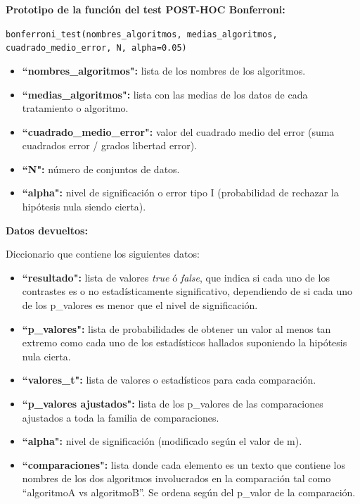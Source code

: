 \noindent
\textbf{Prototipo de la función del test POST-HOC Bonferroni:}

\texttt{bonferroni\_test(nombres\_algoritmos, medias\_algoritmos, cuadrado\_medio\_error, N, alpha=0.05)}

\begin{itemize}
\item \textbf{``nombres\_algoritmos":} lista de los nombres de los algoritmos.
\item \textbf{``medias\_algoritmos":} lista con las medias de los datos de cada tratamiento o algoritmo.
\item \textbf{``cuadrado\_medio\_error":} valor del cuadrado medio del error (suma cuadrados error / grados libertad error).
\item \textbf{``N":} número de conjuntos de datos.
\item \textbf{``alpha":} nivel de significación o error tipo I (probabilidad de rechazar la hipótesis nula siendo cierta).
\end{itemize}

\noindent
\textbf{Datos devueltos:}

Diccionario que contiene los siguientes datos:

\begin{itemize}
\item \textbf{``resultado":} lista de valores \textit{true} ó \textit{false}, que indica si cada uno de los contrastes es o no estadísticamente significativo, dependiendo de si cada uno de los p\_valores es menor que el nivel de significación.
\item \textbf{``p\_valores":} lista de probabilidades de obtener un valor al menos tan extremo como cada uno de los estadísticos hallados suponiendo la hipótesis nula cierta.
\item \textbf{``valores\_t":} lista de valores o estadísticos para cada comparación.
\item \textbf{``p\_valores ajustados":} lista de los p\_valores de las comparaciones ajustados a toda la familia de comparaciones.
\item \textbf{``alpha":} nivel de significación (modificado según el valor de m).
\item \textbf{``comparaciones":} lista donde cada elemento es un texto que contiene los nombres de los dos algoritmos involucrados en la comparación tal como “algoritmoA vs algoritmoB”. Se ordena según del p\_valor de la comparación.
\end{itemize}

